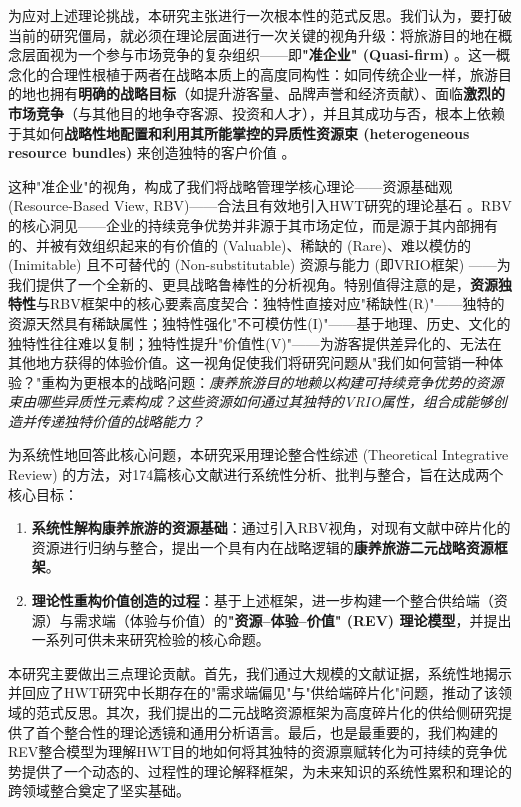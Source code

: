 \documentclass[UTF8, 12pt, a4paper, twoside]{ctexart}
\begin{document}
为应对上述理论挑战，本研究主张进行一次根本性的范式反思。我们认为，要打破当前的研究僵局，就必须在理论层面进行一次关键的视角升级：将旅游目的地在概念层面视为一个参与市场竞争的复杂组织——即\textbf{"准企业" (Quasi-firm)} \parencite{pechlaner2012strategic}。这一概念化的合理性根植于两者在战略本质上的高度同构性：如同传统企业一样，旅游目的地也拥有\textbf{明确的战略目标}（如提升游客量、品牌声誉和经济贡献）、面临\textbf{激烈的市场竞争}（与其他目的地争夺客源、投资和人才），并且其成功与否，根本上依赖于其如何\textbf{战略性地配置和利用其所能掌控的异质性资源束 (heterogeneous resource bundles)} 来创造独特的客户价值 \parencite{hitt2001strategic}。

这种"准企业"的视角，构成了我们将战略管理学核心理论——资源基础观 (Resource-Based View, RBV)——合法且有效地引入HWT研究的理论基石 \parencite{barney1991firm}。RBV的核心洞见——企业的持续竞争优势并非源于其市场定位，而是源于其内部拥有的、并被有效组织起来的有价值的 (Valuable)、稀缺的 (Rare)、难以模仿的 (Inimitable) 且不可替代的 (Non-substitutable) 资源与能力 (即VRIO框架) \parencite{barney1991firm, hitt2001strategic}——为我们提供了一个全新的、更具战略鲁棒性的分析视角。特别值得注意的是，\textbf{资源独特性}与RBV框架中的核心要素高度契合：独特性直接对应"稀缺性(R)"——独特的资源天然具有稀缺属性；独特性强化"不可模仿性(I)"——基于地理、历史、文化的独特性往往难以复制；独特性提升"价值性(V)"——为游客提供差异化的、无法在其他地方获得的体验价值。这一视角促使我们将研究问题从"我们如何营销一种体验？"重构为更根本的战略问题：\textit{康养旅游目的地赖以构建可持续竞争优势的资源束由哪些异质性元素构成？这些资源如何通过其独特的VRIO属性，组合成能够创造并传递独特价值的战略能力？}

为系统性地回答此核心问题，本研究采用理论整合性综述 (Theoretical Integrative Review) 的方法，对174篇核心文献进行系统性分析、批判与整合，旨在达成两个核心目标：
\begin{enumerate}
	\item \textbf{系统性解构康养旅游的资源基础}：通过引入RBV视角，对现有文献中碎片化的资源进行归纳与整合，提出一个具有内在战略逻辑的\textbf{康养旅游二元战略资源框架}。
	\item \textbf{理论性重构价值创造的过程}：基于上述框架，进一步构建一个整合供给端（资源）与需求端（体验与价值）的\textbf{"资源--体验--价值" (REV) 理论模型}，并提出一系列可供未来研究检验的核心命题。
\end{enumerate}
本研究主要做出三点理论贡献。首先，我们通过大规模的文献证据，系统性地揭示并回应了HWT研究中长期存在的"需求端偏见"与"供给端碎片化"问题，推动了该领域的范式反思。其次，我们提出的二元战略资源框架为高度碎片化的供给侧研究提供了首个整合性的理论透镜和通用分析语言。最后，也是最重要的，我们构建的REV整合模型为理解HWT目的地如何将其独特的资源禀赋转化为可持续的竞争优势提供了一个动态的、过程性的理论解释框架，为未来知识的系统性累积和理论的跨领域整合奠定了坚实基础。
\end{document}
